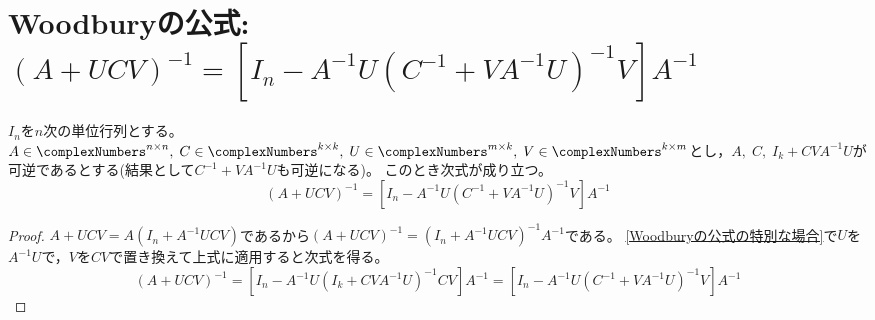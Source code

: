     \section{Woodburyの公式\texorpdfstring{: $(A+UCV)^{-1} = \left[I_n - A^{-1}U(C^{-1} + VA^{-1}U)^{-1}V\right]A^{-1}$}{}}
        \begin{shadebox}
            $I_n$を$n$次の単位行列とする。
            $A\in\complexNumbers^{n\times n},\; C\in\complexNumbers^{k\times k},\; U\in\complexNumbers^{m\times k},\; V\in\complexNumbers^{k\times m}$とし，$A,\;C,\;I_k + CVA^{-1}U$が可逆であるとする(結果として$C^{-1} + VA^{-1}U$も可逆になる)。
            このとき次式が成り立つ。
            \[ (A+UCV)^{-1} = \left[I_n - A^{-1}U(C^{-1} + VA^{-1}U)^{-1}V\right]A^{-1} \]
        \end{shadebox}
        \begin{proof}
            \quad\par
            $A+UCV = A(I_n + A^{-1}UCV)$であるから$(A+UCV)^{-1} = (I_n + A^{-1}UCV)^{-1}A^{-1}$である。
            \ref{Woodburyの公式の特別な場合}で$U$を$A^{-1}U$で，$V$を$CV$で置き換えて上式に適用すると次式を得る。
            \[ (A+UCV)^{-1} = \left[I_n - A^{-1}U(I_k + CVA^{-1}U)^{-1}CV\right]A^{-1} = \left[I_n - A^{-1}U(C^{-1} + VA^{-1}U)^{-1}V\right]A^{-1} \]
        \end{proof}